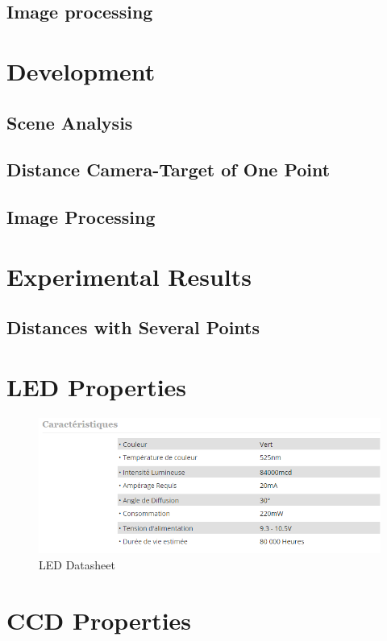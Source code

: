\documentclass[12pt,a4paper,fleqn, onesside]{report}
\begin{document}
\section{Image processing}


\chapter{Development}
\section{Scene Analysis}



\section{Distance Camera-Target of One Point}

\section{Image Processing}



\chapter{Experimental Results}
\section{Distances with Several Points}


\appendix
\chapter{LED Properties}
\label{LEDdatasheet}
\begin{figure}[h]
  \centerline{\includegraphics[scale=0.8]{fig/LedDataSheet.png}}
  \caption{LED Datasheet}
  \label{fig:LEDdatasheet}
\end{figure}

\chapter{CCD Properties}
\label{CCDdatasheet}





\end{document}
